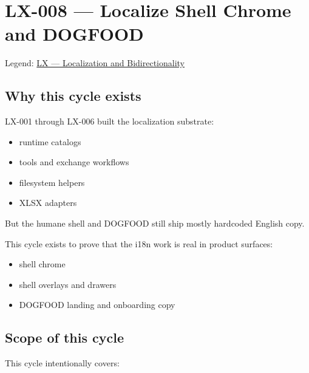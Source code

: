 \chapter{LX-008 --- Localize Shell Chrome and DOGFOOD}\label{record-194}

\smallskip

Legend: \href{https://github.com/flyingrobots/bijou/blob/1853ad902f6bf219326409e7f743a5a1d6517dbc/docs/legends/LX-localization-and-bidirectionality.md}{LX --- Localization and Bidirectionality}

\section{Why this cycle exists}\label{record-194-why-this-cycle-exists}

LX-001 through LX-006 built the localization substrate:

\begin{itemize}
\tightlist
\item
  runtime catalogs
\item
  tools and exchange workflows
\item
  filesystem helpers
\item
  XLSX adapters
\end{itemize}

But the humane shell and DOGFOOD still ship mostly hardcoded English copy.

This cycle exists to prove that the i18n work is real in product surfaces:

\begin{itemize}
\tightlist
\item
  shell chrome
\item
  shell overlays and drawers
\item
  DOGFOOD landing and onboarding copy
\end{itemize}

\section{Scope of this cycle}\label{record-194-scope-of-this-cycle}

This cycle intentionally covers:

